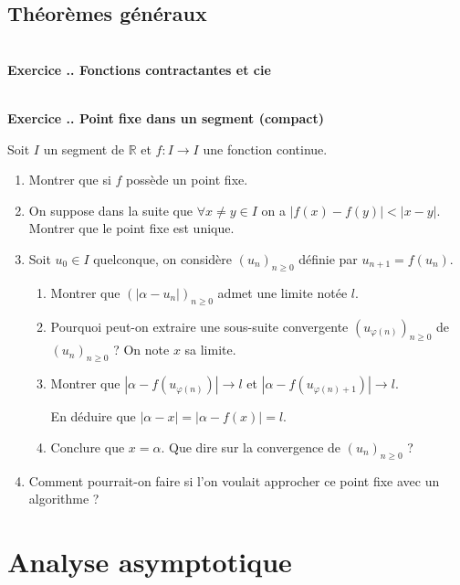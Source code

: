 \documentclass{article}
\newcommand{\mb}[1]{\mathbb{#1}}
\newcounter{exo}
\newcommand{\exercice}[1][\null]{\textbf{\\ Exercice \thesection.\theexo. #1} \addtocounter{exo}{1}}
\begin{document}
\subsection{Théorèmes généraux}

\exercice[Fonctions contractantes et cie]



\exercice[Point fixe dans un segment (compact)]

Soit $I$ un segment de $\mb{R}$ et $f : I \rightarrow I$ une fonction continue.

\begin{enumerate}

\item Montrer que si $f$ possède un point fixe.

\item On suppose dans la suite que $\forall x \neq y \in I$ on a $|f(x) - f(y)| < |x-y|$. Montrer que le point fixe est unique.

\item Soit $u_0 \in I$ quelconque, on considère $(u_n)_{n \ge 0}$ définie par $u_{n+1} = f(u_n)$.

\begin{enumerate}

\item Montrer que $(|\alpha - u_n|)_{n \ge 0}$ admet une limite notée $l$.

\item Pourquoi peut-on extraire une sous-suite convergente $(u_{\varphi(n)})_{n \ge 0}$ de $(u_n)_{n \ge 0}$ ? On note $x$ sa limite.

\item Montrer que  $|\alpha - f(u_{\varphi(n)})|  \rightarrow l$ et $|\alpha - f(u_{\varphi(n)+1})|  \rightarrow l$.

En déduire que $| \alpha - x| = |\alpha - f(x)| = l$.

\item Conclure que $x = \alpha$. Que dire sur la convergence de $(u_n)_{n \ge 0}$ ?

\end{enumerate}


\item Comment pourrait-on faire si l'on voulait approcher ce point fixe avec un algorithme ?
\end{enumerate}



\section{Analyse asymptotique}
\end{document}
